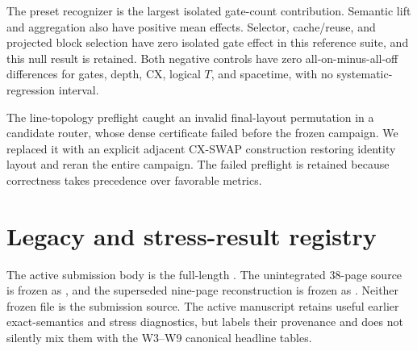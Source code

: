 \documentclass[a4paper,onecolumn,10pt,unpublished]{quantumarticle}
\begin{document}
The preset recognizer is the largest isolated gate-count contribution.
Semantic lift and aggregation also have positive mean effects.  Selector,
cache/reuse, and projected block selection have zero isolated gate effect in
this reference suite, and this null result is retained.  Both negative
controls have zero all-on-minus-all-off differences for gates, depth, CX,
logical $T$, and spacetime, with no systematic-regression interval.

The line-topology preflight caught an invalid final-layout permutation in a
candidate router, whose dense certificate failed before the frozen campaign.
We replaced it with an explicit adjacent CX-SWAP construction restoring
identity layout and reran the entire campaign.  The failed preflight is
retained because correctness takes precedence over favorable metrics.

\section{Legacy and stress-result registry}
\label{supp:legacy}

The active submission body is the full-length
.  The unintegrated 38-page source is frozen as
, and the superseded nine-page
reconstruction is frozen as .  Neither frozen
file is the submission source.  The active manuscript retains useful earlier
exact-semantics and stress diagnostics, but labels their provenance and does
not silently mix them with the W3--W9 canonical headline tables.
\end{document}
